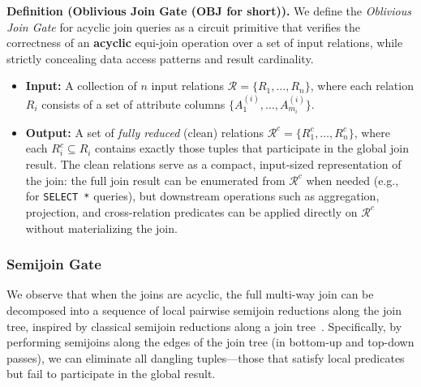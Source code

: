 \documentclass[sigconf]{acmart}
\renewcommand{\emph}[1]{\textit{#1}}
\begin{document}
\textbf{Definition (Oblivious Join Gate (OBJ for short)).} We define the \emph{Oblivious Join Gate} for acyclic join queries as a circuit primitive that verifies the correctness of an \textbf{acyclic} equi-join operation over a set of input relations, while strictly concealing data access patterns and result cardinality.
\begin{itemize}[leftmargin=*]
\item \textbf{Input:} A collection of $n$ input relations $\mathcal{R} = \{R_1, \dots, R_n\}$, where each relation $R_i$ consists of a set of attribute columns $\{A_{1}^{(i)}, \dots, A_{m_i}^{(i)}\}$.
\item \textbf{Output:} A set of \emph{fully reduced} (clean) relations $\mathcal{R}^c = \{R_1^c, \dots, R_n^c\}$, where each $R_i^c \subseteq R_i$ contains exactly those tuples that participate in the global join result. The clean relations serve as a compact, input-sized representation of the join: the full join result can be enumerated from $\mathcal{R}^c$ when needed (e.g., for \texttt{SELECT *} queries), but downstream operations such as aggregation, projection, and cross-relation predicates can be applied directly on $\mathcal{R}^c$ without materializing the join.
\end{itemize}








\subsubsection{Semijoin Gate}
\label{subsubsec:semijoin}
We observe that when the joins are acyclic, the full multi-way join can be decomposed into a sequence of local pairwise semijoin reductions along the join tree, inspired by classical semijoin reductions along a join tree~\cite{yannakakis1981algorithms, beeri1983desirability}.  Specifically, by performing semijoins along the edges of the join tree (in bottom-up and top-down passes), we can eliminate all dangling tuples---those that satisfy local predicates but fail to participate in the global result.
\end{document}
